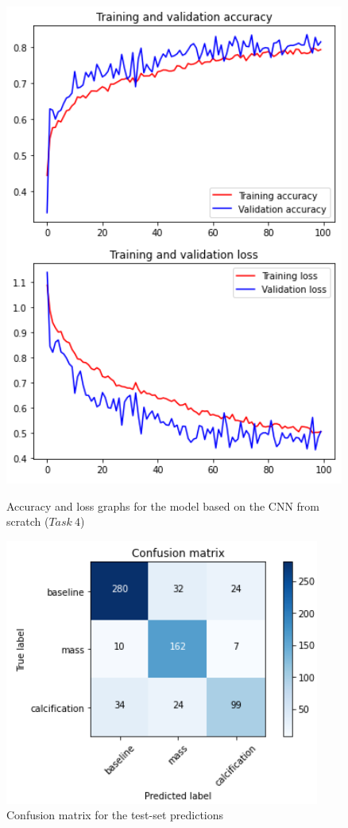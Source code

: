 \documentclass[11pt,a4paper,oneside]{article}
\begin{document}
\begin{figure}[h]
\centering
	\begin{minipage}[c]{.4\textwidth}
		\centering\setlength{\captionmargin}{0pt}%
		\includegraphics[width=.9\textwidth]{images/4.1/2_acc}
		\caption{Accuracy and loss graphs for the model based on the CNN from scratch ($Task\ 4$)}
		\label{fig:4_acc_w}
	\end{minipage}
	\hspace{5mm}%
	\begin{minipage}[c]{.4\textwidth}
		\centering\setlength{\captionmargin}{0pt}%
		\includegraphics[width=.9\textwidth]{images/4.1/2_matrix}
		\caption{Confusion matrix for the test-set predictions}
		\label{fig:4_matrix_w}
	\end{minipage}%
\end{figure}
\end{document}
